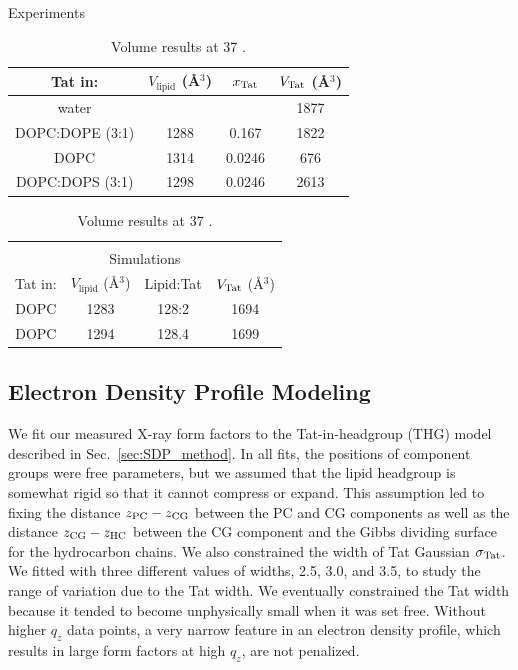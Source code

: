 \begin{table}[htbp]
  \centering
  Experiments\\
  \begin{tabular}{cccc}
    \hline
    Tat in: & $V_\textrm{lipid}$ (\AA$^3$) & $x_\textrm{Tat}$ & $V_\textrm{Tat}$ (\AA$^3$) \\
    \hline
    water & & & 1877 \\
    DOPC:DOPE (3:1) & 1288 & 0.167 & 1822 \\
    DOPC & 1314 & 0.0246 & 676 \\
    DOPC:DOPS (3:1) & 1298 & 0.0246 & 2613 \\
    \hline 
  \end{tabular}
  \quad
  \begin{tabular}{cccc}
    & & & \\
    \multicolumn{4}{c}{Simulations} \\ 
    \hline
    Tat in: & $V_\textrm{lipid}$ (\AA$^3$) & Lipid:Tat & $V_\textrm{Tat}$ (\AA$^3$) \\
    \hline
    DOPC & 1283 & 128:2 & 1694 \\
    DOPC & 1294 & 128.4 & 1699 \\
    \hline
  \end{tabular}
  \caption[Volume results at 37 \textcelsius]
  {Volume results at 37 \textcelsius.}
  \label{tab:volumes}
\end{table}

\newpage
\subsection{Electron Density Profile Modeling}\label{sec:SDP_results}
We fit our measured X-ray form factors to the Tat-in-headgroup (THG) model described in 
Sec.~\ref{sec:SDP_method}. In all fits,
the positions of component groups were free parameters, but we 
assumed that the lipid headgroup is somewhat rigid so that it cannot compress
or expand. This assumption led to fixing the distance
$z_\textrm{PC}-z_\textrm{CG}$ between the PC and CG components as well
as the distance $z_\textrm{CG}-z_\textrm{HC}$ between the CG component and the Gibbs dividing
surface for the hydrocarbon chains. 
We also constrained the width of Tat 
Gaussian $\sigma_\textrm{Tat}$. We fitted with three different values of widths,
2.5, 3.0, and 3.5, to study the range of variation due to the Tat width. 
We eventually constrained the Tat width 
because it tended to become unphysically small
when it was set free. Without higher $q_z$ data points, a very narrow feature
in an electron density profile, which results in large form factors at high $q_z$,
are not penalized.  

